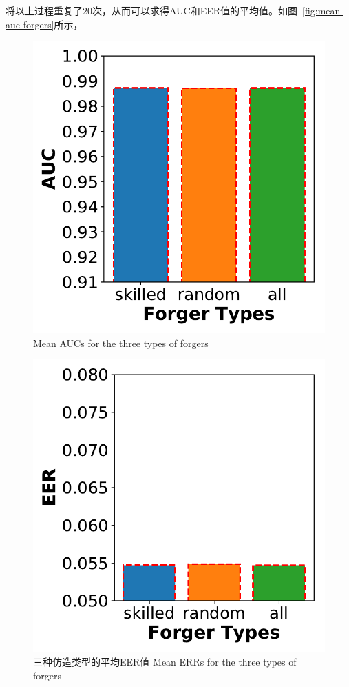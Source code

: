 将以上过程重复了20次，从而可以求得AUC和EER值的平均值。如图~\ref{fig:mean-auc-forgers}所示，
\begin{figure}[!htp]
  \centering
  \begin{minipage}[t]{0.49\textwidth}
    \centering
    \includegraphics[width=\textwidth]{figure/auc-bars.pdf}
      {Mean AUCs for the three types of forgers}
        \label{fig:mean-auc-forgers}
  \end{minipage}
  \centering
  \begin{minipage}[t]{0.49\textwidth}
    \centering
    \includegraphics[width=\textwidth]{figure/eer-bars.pdf}
    \bicaption
    {三种仿造类型的平均EER值}
    {Mean ERRs for the three types of forgers}
    \label{fig:mean-eer-forgers}
   \end{minipage}
\end{figure}
